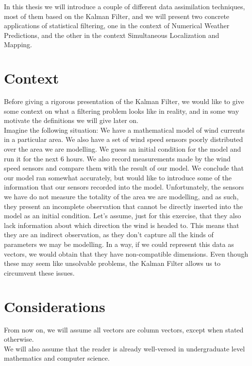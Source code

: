 \documentclass{article}
\begin{document}
In this thesis we will introduce a couple of different data assimilation techniques, most of them based on the Kalman Filter, and we will present two concrete applications of statistical filtering, one in the context of Numerical Weather Predictions, and the other in the context Simultaneous Localization and Mapping. \\

\section{Context}

Before giving a rigorous presentation of the Kalman Filter, we would like to give some context on what a filtering problem looks like in reality, and in some way motivate the definitions we will give later on. \\

Imagine the following situation: We have a mathematical model of wind currents in a particular area. We also have a set of wind speed sensors poorly distributed over the area we are modelling. We guess an initial condition for the model and run it for the next 6 hours. We also record measurements made by the wind speed sensors and compare them with the result of our model. We conclude that our model ran somewhat accurately, but would like to introduce some of the information that our sensors recorded into the model. Unfortunately, the sensors we have do not measure the totality of the area we are modelling, and as such, they present an incomplete observation that cannot be directly inserted into the model as an initial condition. Let's assume, just for this exercise, that they also lack information about which direction the wind is headed to. This means that they are an indirect observation, as they don't capture all the kinds of parameters we may be modelling. In a way, if we could represent this data as vectors, we would obtain that they have non-compatible dimensions. Even though these may seem like unsolvable problems, the Kalman Filter allows us to circumvent these issues. \\

\section{Considerations}

From now on, we will assume all vectors are column vectors, except when stated otherwise. \\

We will also assume that the reader is already well-versed in undergraduate level mathematics and computer science. \\
\end{document}
